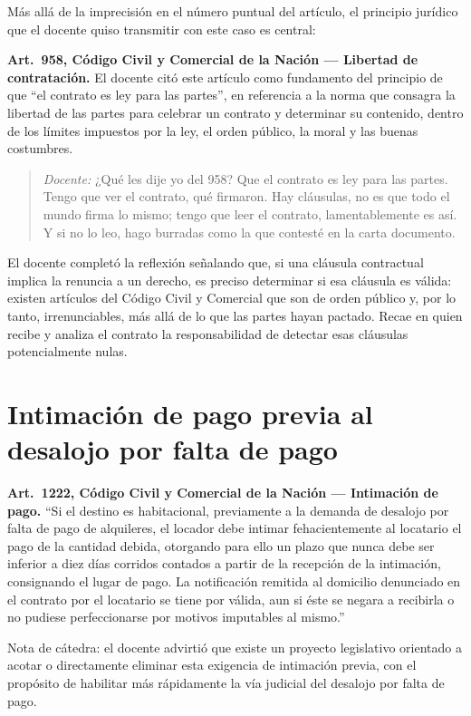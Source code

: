 \documentclass[12pt,oneside]{book}
\begin{document}
Más allá de la imprecisión en el número puntual del artículo, el principio jurídico que el docente quiso transmitir con este caso es central:

\begin{important}
\textbf{Art.\ 958, Código Civil y Comercial de la Nación — Libertad de contratación.} El docente citó este artículo como fundamento del principio de que ``el contrato es ley para las partes'', en referencia a la norma que consagra la libertad de las partes para celebrar un contrato y determinar su contenido, dentro de los límites impuestos por la ley, el orden público, la moral y las buenas costumbres.
\end{important}

\begin{quote}
\textit{Docente:} ¿Qué les dije yo del 958? Que el contrato es ley para las partes. Tengo que ver el contrato, qué firmaron. Hay cláusulas, no es que todo el mundo firma lo mismo; tengo que leer el contrato, lamentablemente es así. Y si no lo leo, hago burradas como la que contesté en la carta documento.
\end{quote}

El docente completó la reflexión señalando que, si una cláusula contractual implica la renuncia a un derecho, es preciso determinar si esa cláusula es válida: existen artículos del Código Civil y Comercial que son de orden público y, por lo tanto, irrenunciables, más allá de lo que las partes hayan pactado. Recae en quien recibe y analiza el contrato la responsabilidad de detectar esas cláusulas potencialmente nulas.

\section{Intimación de pago previa al desalojo por falta de pago}

\begin{important}
\textbf{Art.\ 1222, Código Civil y Comercial de la Nación — Intimación de pago.} ``Si el destino es habitacional, previamente a la demanda de desalojo por falta de pago de alquileres, el locador debe intimar fehacientemente al locatario el pago de la cantidad debida, otorgando para ello un plazo que nunca debe ser inferior a diez días corridos contados a partir de la recepción de la intimación, consignando el lugar de pago. La notificación remitida al domicilio denunciado en el contrato por el locatario se tiene por válida, aun si éste se negara a recibirla o no pudiese perfeccionarse por motivos imputables al mismo.''

Nota de cátedra: el docente advirtió que existe un proyecto legislativo orientado a acotar o directamente eliminar esta exigencia de intimación previa, con el propósito de habilitar más rápidamente la vía judicial del desalojo por falta de pago.
\end{important}
\end{document}
